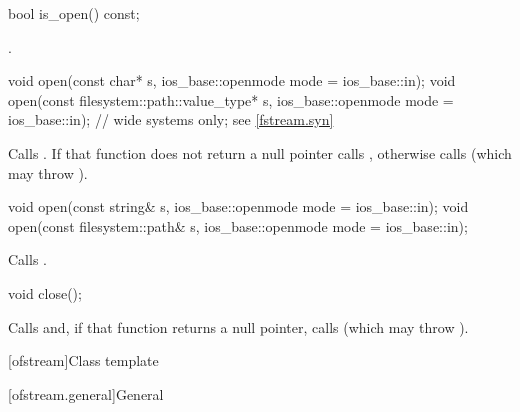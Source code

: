 %
\begin{itemdecl}
bool is_open() const;
\end{itemdecl}

\begin{itemdescr}
\pnum
\returns
{}.
\end{itemdescr}

%
\begin{itemdecl}
void open(const char* s, ios_base::openmode mode = ios_base::in);
void open(const filesystem::path::value_type* s,
          ios_base::openmode mode = ios_base::in);  // wide systems only; see \ref{fstream.syn}
\end{itemdecl}

\begin{itemdescr}
\pnum
\effects
Calls
.
If that function does not return a null pointer
calls ,
otherwise calls
(which may throw
).
\end{itemdescr}

%
\begin{itemdecl}
void open(const string& s, ios_base::openmode mode = ios_base::in);
void open(const filesystem::path& s, ios_base::openmode mode = ios_base::in);
\end{itemdecl}

\begin{itemdescr}
\pnum
\effects
Calls .
\end{itemdescr}

%
\begin{itemdecl}
void close();
\end{itemdecl}

\begin{itemdescr}
\pnum
\effects
Calls
and, if that function returns
a null pointer,
calls
(which may throw
).
\end{itemdescr}

[ofstream]{Class template }

[ofstream.general]{General}

